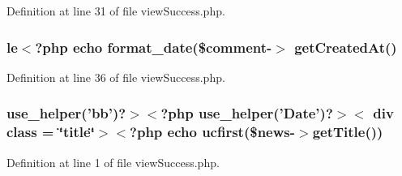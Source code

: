 Definition at line 31 of file view\-Success.\-php.

\hypertarget{live_2modules_2news_2templates_2view_success_8php_a684dd27287fcedcbe91ff8c7cc23f3bb}{
\subsubsection[{get\-Created\-At}]{\setlength{\rightskip}{0pt plus 5cm}le$<$?php echo format\-\_\-date(\$comment-\/$>$ get\-Created\-At()}}\label{live_2modules_2news_2templates_2view_success_8php_a684dd27287fcedcbe91ff8c7cc23f3bb}


Definition at line 36 of file view\-Success.\-php.

\hypertarget{live_2modules_2news_2templates_2view_success_8php_a74dbb0c2c09a42cc7f5aa67bd29c2520}{
\subsubsection[{use\-\_\-helper}]{\setlength{\rightskip}{0pt plus 5cm}use\-\_\-helper('bb')?$>$$<$?php use\-\_\-helper('Date')?$>$$<$ div {\bf class} = \char`\"{}title\char`\"{}$>$$<$?php echo ucfirst(\$news-\/$>${\bf get\-Title}())}}\label{live_2modules_2news_2templates_2view_success_8php_a74dbb0c2c09a42cc7f5aa67bd29c2520}


Definition at line 1 of file view\-Success.\-php.

